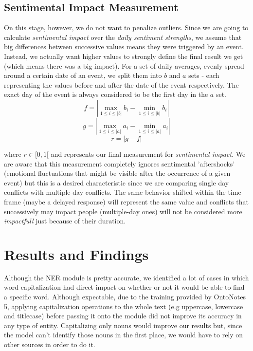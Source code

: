 \documentclass[11pt]{article}
\begin{document}
	\subsection{Sentimental Impact Measurement}
	\label{sub:sentimental_impact_measurement}
	On this stage, however, we do not want to penalize outliers. Since we are going to calculate \textit{sentimental impact} over the \textit{daily sentiment strengths}, we assume that big differences between successive values means they were triggered by an event. Instead, we actually want higher values to strongly define the final result we get (which means there was a big impact). 
	For a set of daily averages, evenly spread around a certain date of an event, we split them into $b$ and $a$ sets - each representing the values before and after the date of the event respectively. The exact day of the event is always considered to be the first day in the $a$ set.
	\begin{equation}
	f = |\max_{1 \leq i \leq |b|} b_{i} - \min_{1 \leq i \leq |b|} b_{i}|
	\end{equation}
	\begin{equation}
	g = |\max_{1 \leq i \leq |a|} a_{i} - \min_{1 \leq i \leq |a|} a_{i}|
	\end{equation}
	\begin{equation}
	r = |g - f|
	\end{equation}
	
	where $r \in [0, 1[$ and represents our final measurement for \textit{sentimental impact}. We are aware that this measurement completely ignores sentimental 'aftershocks' (emotional fluctuations that might be visible after the occurrence of a given event) but this is a desired characteristic since we are comparing single day conflicts with multiple-day conflicts. The same behavior shifted within the time-frame (maybe a delayed response) will represent the same value and conflicts that successively may impact people (multiple-day ones) will not be considered more \textit{impactfull} just because of their duration.
	
	\section{Results and Findings}
	Although the NER module is pretty accurate, we identified a lot of cases in which word capitalization had direct impact on whether or not it would be able to find a specific word. Although expectable, due to the training provided by OntoNotes 5, applying capitalization operations to the whole text (e.g uppercase, lowercase and titlecase) before passing it onto the module did not improve its accuracy in any type of entity. Capitalizing only nouns would improve our results but, since the model can't identify those nouns in the first place, we would have to rely on other sources in order to do it.
	
\end{document}

